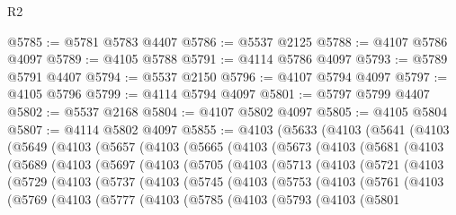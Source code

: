 \begin{lexlean}{R2}
\begin{coremodule}
@5785 := @5781 @5783 @4407
@5786 := @5537 @2125
@5788 := @4107 @5786 @4097
@5789 := @4105 @5788
@5791 := @4114 @5786 @4097
@5793 := @5789 @5791 @4407
@5794 := @5537 @2150
@5796 := @4107 @5794 @4097
@5797 := @4105 @5796
@5799 := @4114 @5794 @4097
@5801 := @5797 @5799 @4407
@5802 := @5537 @2168
@5804 := @4107 @5802 @4097
@5805 := @4105 @5804
@5807 := @4114 @5802 @4097
@5855 := @4103
    (@5633
      (@4103
        (@5641
          (@4103
            (@5649
              (@4103
                (@5657
                  (@4103
                    (@5665
                      (@4103
                        (@5673
                          (@4103
                            (@5681
                              (@4103
                                (@5689
                                  (@4103
                                    (@5697
                                      (@4103
                                        (@5705
                                          (@4103
                                            (@5713
                                              (@4103
                                                (@5721
                                                  (@4103
                                                    (@5729
                                                      (@4103
                                                        (@5737
                                                          (@4103
                                                            (@5745
                                                              (@4103
                                                                (@5753
                                                                  (@4103
                                                                    (@5761
                                                                      (@4103
                                                                        (@5769
                                                                          (@4103
                                                                            (@5777
                                                                              (@4103
                                                                                (@5785
                                                                                  (@4103
                                                                                    (@5793
                                                                                      (@4103
                                                                                        (@5801

\end{coremodule}
\end{lexlean}
